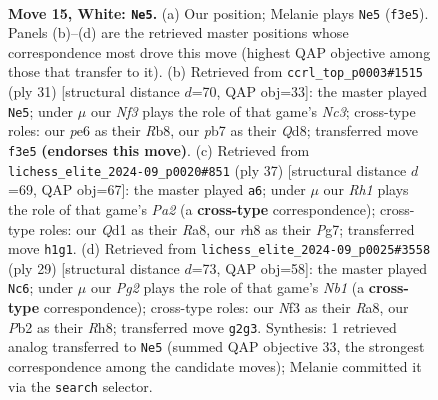 \documentclass[11pt]{article}
\begin{document}
\clearpage

\begin{figure}[p]\centering
\begin{subfigure}{0.46\textwidth}\centering
\resizebox{\linewidth}{!}{%
\newchessgame
\chessboard[
  setfen={2kr3r/ppp2ppp/2bqp3/8/2PP4/5N2/PP2KPPP/1R1Q3R w - - 2 15},
  showmover=false,
  pgfstyle=straightmove, color=movearrow, markmove={f3-e5}
]}
\caption{}
\end{subfigure}\hfill
\begin{subfigure}{0.46\textwidth}\centering
\resizebox{\linewidth}{!}{%
\newchessgame
\chessboard[
  setfen={1r1q1rk1/3b1p1p/p1np1pp1/8/2P5/6P1/P1NQPPBP/R4RK1 b - - 0 16},
  showmover=false,
  pgfstyle=straightmove, color=movearrow, markmove={c6-e5}
]}
\caption{}
\end{subfigure}
\\[4pt]
\begin{subfigure}{0.46\textwidth}\centering
\resizebox{\linewidth}{!}{%
\newchessgame
\chessboard[
  setfen={r5k1/pp2rpp1/5np1/3pq3/8/2PB1QPP/PP4PK/R4R2 b - - 2 19},
  showmover=false,
  pgfstyle=straightmove, color=movearrow, markmove={a7-a6}
]}
\caption{}
\end{subfigure}\hfill
\begin{subfigure}{0.46\textwidth}\centering
\resizebox{\linewidth}{!}{%
\newchessgame
\chessboard[
  setfen={rn1qk2r/1p3p1p/p3pp2/3p4/3B4/8/PPP1QPPP/2KRR3 b kq - 1 15},
  showmover=false,
  pgfstyle=straightmove, color=movearrow, markmove={b8-c6}
]}
\caption{}
\end{subfigure}
\caption{\textbf{Move 15, White: \texttt{Ne5}.} (a) Our position; Melanie plays \texttt{Ne5} (\texttt{f3e5}). Panels (b)--(d) are the retrieved master positions whose correspondence most drove this move (highest QAP objective among those that transfer to it). (b) Retrieved from \texttt{ccrl\_top\_p0003\#1515} (ply 31) [structural distance $d$=70, QAP obj=33]: the master played \texttt{Ne5}; under $\mu$ our \emph{Nf3} plays the role of that game's \emph{Nc3}; cross-type roles: our \emph{p}e6 as their \emph{R}b8, our \emph{p}b7 as their \emph{Q}d8; transferred move \texttt{f3e5} \textbf{(endorses this move)}. (c) Retrieved from \texttt{lichess\_elite\_2024-09\_p0020\#851} (ply 37) [structural distance $d$=69, QAP obj=67]: the master played \texttt{a6}; under $\mu$ our \emph{Rh1} plays the role of that game's \emph{Pa2} (a \textbf{cross-type} correspondence); cross-type roles: our \emph{Q}d1 as their \emph{R}a8, our \emph{r}h8 as their \emph{P}g7; transferred move \texttt{h1g1}. (d) Retrieved from \texttt{lichess\_elite\_2024-09\_p0025\#3558} (ply 29) [structural distance $d$=73, QAP obj=58]: the master played \texttt{Nc6}; under $\mu$ our \emph{Pg2} plays the role of that game's \emph{Nb1} (a \textbf{cross-type} correspondence); cross-type roles: our \emph{N}f3 as their \emph{R}a8, our \emph{P}b2 as their \emph{R}h8; transferred move \texttt{g2g3}. Synthesis: 1 retrieved analog transferred to \texttt{Ne5} (summed QAP objective 33, the strongest correspondence among the candidate moves); Melanie committed it via the \texttt{search} selector.}
\label{fig:thought-m28}
\end{figure}
\end{document}
